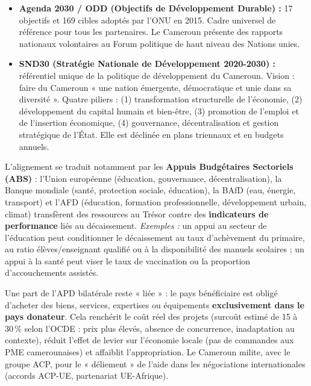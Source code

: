 \documentclass[11pt]{article}
\begin{document}
\begin{itemize}
    \item \textbf{Agenda 2030 / ODD (Objectifs de Développement Durable) :} 17 objectifs et 169 cibles adoptés par l'ONU en 2015. Cadre universel de référence pour tous les partenaires. Le Cameroun présente des rapports nationaux volontaires au Forum politique de haut niveau des Nations unies.
    \item \textbf{SND30 (Stratégie Nationale de Développement 2020-2030) :} référentiel unique de la politique de développement du Cameroun. Vision : faire du Cameroun « une nation émergente, démocratique et unie dans sa diversité ». Quatre piliers : (1) transformation structurelle de l'économie, (2) développement du capital humain et bien-être, (3) promotion de l'emploi et de l'insertion économique, (4) gouvernance, décentralisation et gestion stratégique de l'État. Elle est déclinée en plans triennaux et en budgets annuels.
\end{itemize}

L'alignement se traduit notamment par les \textbf{Appuis Budgétaires Sectoriels (ABS)} : l'Union européenne (éducation, gouvernance, décentralisation), la Banque mondiale (santé, protection sociale, éducation), la BAfD (eau, énergie, transport) et l'AFD (éducation, formation professionnelle, développement urbain, climat) transfèrent des ressources au Trésor contre des \textbf{indicateurs de performance} liés au décaissement.
\emph{Exemples :} un appui au secteur de l'éducation peut conditionner le décaissement au taux d'achèvement du primaire, au ratio élèves/enseignant qualifié ou à la disponibilité des manuels scolaires ; un appui à la santé peut viser le taux de vaccination ou la proportion d'accouchements assistés.

\begin{attention}
Une part de l'APD bilatérale reste « liée » : le pays bénéficiaire est obligé d'acheter des biens, services, expertises ou équipements \textbf{exclusivement dans le pays donateur}. Cela renchérit le coût réel des projets (surcoût estimé de 15 à 30\,\% selon l'OCDE : prix plus élevés, absence de concurrence, inadaptation au contexte), réduit l'effet de levier sur l'économie locale (pas de commandes aux PME camerounaises) et affaiblit l'appropriation. Le Cameroun milite, avec le groupe ACP, pour le « déliement » de l'aide dans les négociations internationales (accords ACP-UE, partenariat UE-Afrique).
\end{attention}
\end{document}
